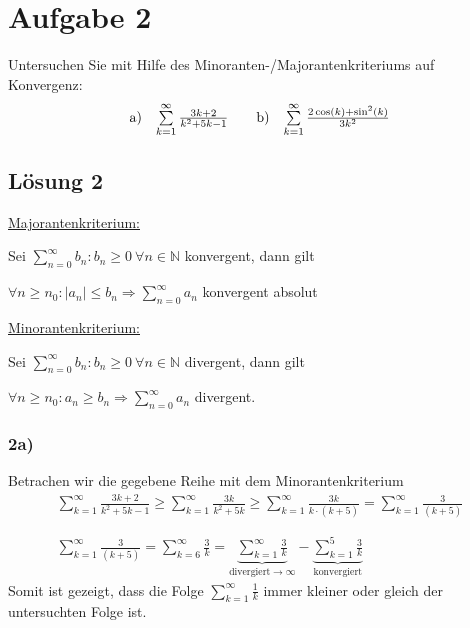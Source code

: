 \section{Aufgabe 2}

Untersuchen Sie mit Hilfe des Minoranten-/Majorantenkriteriums auf Konvergenz:
\begin{align*}
  \begin{array}{ c c }
    \text{a)} & \sum\limits _{k=1}^{\infty }\frac{3k+2}{k^{2} +5k-1}
  \end{array} & & \begin{array}{ c c }
    \text{b)} & \sum\limits _{k=1}^{\infty }\frac{2\cos( k) +\sin^{2}( k)}{3k^{2}}
  \end{array}
\end{align*}

\subsection{Lösung 2}

\underline{Majorantenkriterium:} 

Sei $\displaystyle \sum _{n=0}^{\infty } b_{n} :b_{n} \geq 0\ \forall n\in \mathbb{N}$ konvergent, dann gilt

$\displaystyle \forall n\geq n_{0} :|a_{n} |\leq b_{n} \Rightarrow \sum _{n=0}^{\infty } a_{n}$ konvergent absolut



\underline{Minorantenkriterium:}

Sei $\displaystyle \sum _{n=0}^{\infty } b_{n} :b_{n} \geq 0\ \forall n\in \mathbb{N}$ divergent, dann gilt

$\displaystyle \forall n\geq n_{0} :a_{n} \geq b_{n} \Rightarrow \sum _{n=0}^{\infty } a_{n}$ divergent.

\subsubsection{2a)} 

Betrachen wir die gegebene Reihe mit dem Minorantenkriterium
\begin{gather*}
  \sum\limits _{k=1}^{\infty }\frac{3k+2}{k^{2} +5k-1} \geq \sum\limits _{k=1}^{\infty }\frac{3k}{k^{2} +5k} \geq \sum\limits _{k=1}^{\infty }\frac{3k}{k\cdotp ( k +5)} =\sum\limits _{k=1}^{\infty }\frac{3}{( k +5)}\\
  \\
  \\
  \sum\limits _{k=1}^{\infty }\frac{3}{( k +5)} =\sum\limits _{k=6}^{\infty }\frac{3}{k} =\underbrace{\sum\limits _{k=1}^{\infty }\frac{3}{k}}_{\text{divergiert}\rightarrow \infty } -\underbrace{\sum\limits _{k=1}^{5}\frac{3}{k}}_{\text{konvergiert}}
\end{gather*}
Somit ist gezeigt, dass die Folge $\displaystyle \sum\nolimits _{k=1}^{\infty }\frac{1}{k}$ immer kleiner oder gleich der untersuchten Folge ist.\\

